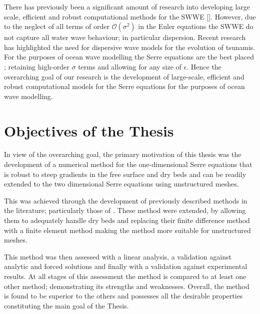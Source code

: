There has previously been a significant amount of research into developing large scale, efficient and robust computational methods for the SWWE []. However, due to the neglect of all terms of order $\mathcal{O}\left(\sigma ^2\right)$ in the Euler equations the SWWE do not capture all water wave behaviour; in particular dispersion. Recent research \cite{Grue-etal-2008-113,Kirby-etal-2013-39} has highlighted the need for dispersive wave models for the evolution of tsunamis. For the purposes of ocean wave modelling the Serre equations are the best placed \cite{Bonneton-Lannes-2009-16601}; retaining high-order $\sigma$ terms and allowing for any size of $\epsilon$. Hence the overarching goal of our research is the development of large-scale, efficient and robust computational models for the Serre equations for the purposes of ocean wave modelling.



\section{Objectives of the Thesis}
%
%


In view of the overarching goal, the primary motivation of this thesis was the development of a numerical method for the one-dimensional Serre equations that is robust to steep gradients in the free surface and dry beds and can be readily extended to the two dimensional Serre equations using unstructured meshes. 

This was achieved through the development of previously described methods in the literature; particularly those of \citet{Zoppou-2014}. These method were extended, by allowing them to adequately handle dry beds and replacing their finite difference method with a finite element method making the method more suitable for unstructured meshes. 

This method was then assessed with a linear analysis, a validation against analytic and forced solutions and finally with a validation against experimental results. At all stages of this assessment the method is compared to at least one other method; demonstrating its strengths and weaknesses. Overall, the method is found to be superior to the others and possesses all the desirable properties constituting the main goal of the Thesis.  

